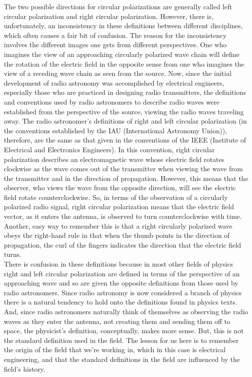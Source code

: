 \documentclass[10pt]{report}
\begin{document}
 
The two possible directions for circular polarizations are generally called left circular polarization and right circular polarization.  However, there is, unfortunately, an inconsistency in these definitions between different disciplines, which often causes a fair bit of confusion.  The reason for the inconsistency involves the different images one gets from different perspectives.  One who imagines the view of an approaching circularly polarized wave chain will define the rotation of the electric field in the opposite sense from one who imagines the view of a receding wave chain as seen from the source. 
Now, since the initial development of radio astronomy was accomplished by electrical engineers, especially those who are practiced in designing radio transmitters, the definitions and conventions used by radio astronomers to describe radio waves were established from the perspective of the source, viewing the radio waves traveling away.  The radio astronomer's definitions of right and left circular polarization (in the conventions established by the IAU (International Astronomy Union)), therefore, are the same as that given in the conventions of the IEEE (Institute of Electrical and Electronics Engineers).  In this convention, right circular polarization describes an electromagnetic wave whose electric field rotates clockwise as the wave comes out of the transmitter when viewing the wave from the transmitter and in the direction of propagation.  However, this means that the observer, who views the wave from the opposite direction, will see the electric field rotate counterclockwise.  So, in terms of the observation of a circularly polarized radio signal, right circular polarization means that the electric field vector, as it enters the antenna, is observed to turn counterclockwise with time.  Another, easy way to remember this is that a right circularly polarized wave obeys the right-hand rule in that when the thumb points in the direction of propagation, the curl of the fingers indicates the direction that the electric field turns. \\
There is confusion in these definitions because in most other fields of physics right and left circular polarization are defined in terms of the perspective of an approaching wave and so are given the opposite definitions from those used by radio astronomers.  Since radio astronomy is now considered a branch of physics there is a natural tendency to hold onto the definitions found in physics texts.  And, since radio astronomers naturally think of themselves as observing the radio waves as they enter the antenna, not creating them and sending them off to space, the physicist's definition, conceptually, makes more sense.  But, this is not the standard definition used in the field.  The lesson for us here is to remember the origin of the field that we're working in, which in this case is electrical engineering, and that the standard definitions in the field are influenced by the field's history. \\
\end{document}
